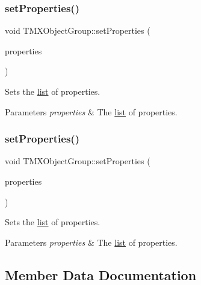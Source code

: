 \subsubsection{\texorpdfstring{set\+Properties()}{setProperties()}\hspace{0.1cm}{\footnotesize\ttfamily [1/2]}}
{\footnotesize\ttfamily void T\+M\+X\+Object\+Group\+::set\+Properties (\begin{DoxyParamCaption}\item[{const Value\+Map \&}]{properties }\end{DoxyParamCaption})\hspace{0.3cm}{\ttfamily [inline]}}

Sets the \hyperlink{protocollist-p}{list} of properties.


\begin{DoxyParams}{Parameters}
{\em properties} & The \hyperlink{protocollist-p}{list} of properties. \\
\hline
\end{DoxyParams}
\mbox{\label{classTMXObjectGroup_aefd094cfbf8755171cfc69689910b1de}} 
\subsubsection{\texorpdfstring{set\+Properties()}{setProperties()}\hspace{0.1cm}{\footnotesize\ttfamily [2/2]}}
{\footnotesize\ttfamily void T\+M\+X\+Object\+Group\+::set\+Properties (\begin{DoxyParamCaption}\item[{const Value\+Map \&}]{properties }\end{DoxyParamCaption})\hspace{0.3cm}{\ttfamily [inline]}}

Sets the \hyperlink{protocollist-p}{list} of properties.


\begin{DoxyParams}{Parameters}
{\em properties} & The \hyperlink{protocollist-p}{list} of properties. \\
\hline
\end{DoxyParams}


\subsection{Member Data Documentation}
\mbox{\label{classTMXObjectGroup_a04e557d994f1cdb9de741dd4567e7419}} 
